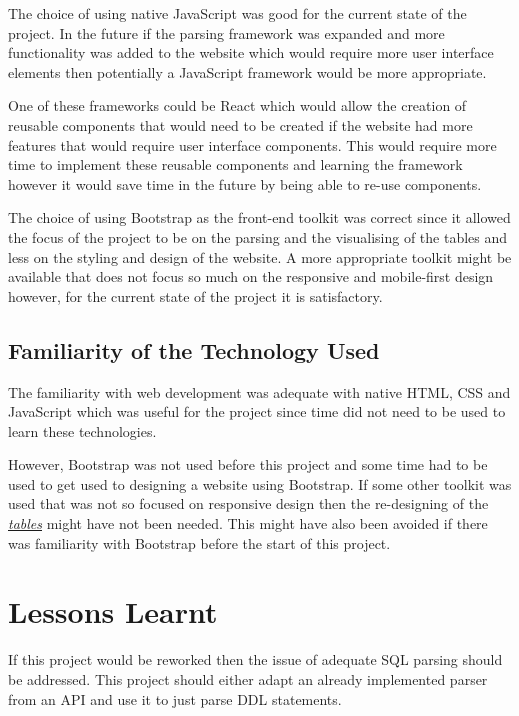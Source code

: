 The choice of using native JavaScript was good for the current state of the project. In the future if the parsing framework was expanded and more functionality was added to the website which would require more user interface elements then potentially a JavaScript framework would be more appropriate. 

One of these frameworks could be React which would allow the creation of reusable components that would need to be created if the website had more features that would require user interface components. This would require more time to implement these reusable components and learning the framework however it would save time in the future by being able to re-use components. 

The choice of using Bootstrap as the front-end toolkit was correct since it allowed the focus of the project to be on the parsing and the visualising of the tables and less on the styling and design of the website. A more appropriate toolkit might be available that does not focus so much on the responsive and mobile-first design however, for the current state of the project it is satisfactory. 

\subsection{Familiarity of the Technology Used}

The familiarity with web development was adequate with native HTML, CSS and JavaScript which was useful for the project since time did not need to be used to learn these technologies. 

However, Bootstrap was not used before this project and some time had to be used to get used to designing a website using Bootstrap. If some other toolkit was used that was not so focused on responsive design then the re-designing of the \textit{\hyperref[fig:squash]{tables}} might have not been needed. This might have also been avoided if there was familiarity with Bootstrap before the start of this project. 

\section{Lessons Learnt}

If this project would be reworked then the issue of adequate SQL parsing should be addressed. This project should either adapt an already implemented parser from an API and use it to just parse DDL statements. 


